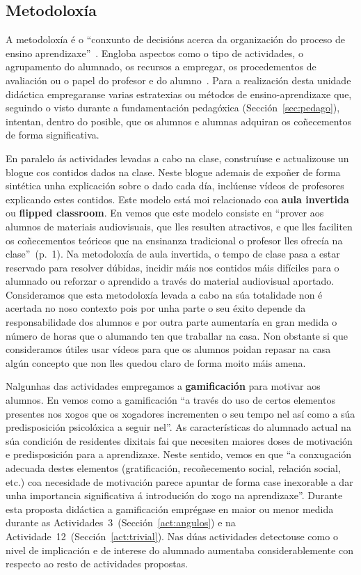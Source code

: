 \subsection{Metodoloxía}

A metodoloxía é o ``conxunto de decisións acerca da organización do proceso de ensino aprendizaxe''~\cite[p.~18]{orientacionesgobvasco}. Engloba aspectos como o tipo de actividades, o agrupamento do alumnado, os recursos a empregar, os procedementos de avaliación ou o papel do profesor e do alumno~\cite{orientacionesgobvasco}. Para a realización desta unidade didáctica empregaranse varias estratexias ou métodos de ensino-aprendizaxe que, seguindo o visto durante a fundamentación pedagóxica (Sección~\ref{sec:pedago}), intentan, dentro do posible, que os alumnos e alumnas adquiran os coñecementos de forma significativa.

En paralelo ás actividades levadas a cabo na clase, construíuse e actualizouse un blogue cos contidos dados na clase. Neste blogue ademais de expoñer de forma sintética unha explicación sobre o dado cada día, inclúense vídeos de profesores explicando estes contidos. Este modelo está moi relacionado coa \textbf{aula invertida} ou \textbf{flipped classroom}. En  vemos que este modelo consiste en ``prover aos alumnos de materiais audiovisuais, que lles resulten atractivos, e que lles faciliten os coñecementos teóricos que na ensinanza tradicional o profesor lles ofrecía na clase''~(p.~1). Na metodoloxía de aula invertida, o tempo de clase pasa a estar reservado para resolver dúbidas, incidir máis nos contidos máis difíciles para o alumnado ou reforzar o aprendido a través do material audiovisual aportado. Consideramos que esta metodoloxía levada a cabo na súa totalidade non é acertada no noso contexto pois por unha parte o seu éxito depende da responsabilidade dos alumnos e por outra parte aumentaría en gran medida o número de horas que o alumando ten que traballar na casa. Non obstante si que consideramos útiles usar vídeos para que os alumnos poidan repasar na casa algún concepto que non lles quedou claro de forma moito máis amena.

Nalgunhas das actividades empregamos a \textbf{gamificación} para motivar aos alumnos. En  vemos como a gamificación ``a través do uso de certos elementos presentes nos xogos que os xogadores incrementen o seu tempo nel así como a súa predisposición psicolóxica a seguir nel''. As características do alumnado actual na súa condición de residentes dixitais \cite{residentesdigitales} fai que necesiten maiores doses de motivación e predisposición para a aprendizaxe. Neste sentido, vemos en  que ``a conxugación adecuada destes elementos (gratificación, recoñecemento social, relación social, etc.) coa necesidade de motivación parece apuntar de forma case inexorable a dar unha importancia significativa á introdución do xogo na aprendizaxe''. Durante esta proposta didáctica a gamificación emprégase en maior ou menor medida durante as Actividades~3~(Sección~\ref{act:angulos}) e na Actividade~12~(Sección~\ref{act:trivial}). Nas dúas actividades detectouse como o nivel de implicación e de interese do alumnado aumentaba considerablemente con respecto ao resto de actividades propostas.


